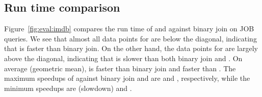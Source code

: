 


\subsection{Run time comparison}\label{sec:run-time-comparison}

Figure~\ref{fig:eval:imdb} compares the run time of \FJ and \GJ against binary join on JOB queries.
We see that almost all data points for \FJ are below the diagonal,
indicating that \FJ is faster than binary join.
On the other hand, the data points for \GJ are largely above the diagonal,
indicating that \GJ is slower than both binary join and \FJ.
On average (geometric mean), \FJ is \imdbavgfjbj faster than binary join
and \imdbavgfjgj faster than \GJ.
The maximum speedups of \FJ against binary join and \GJ
are \imdbmaxfjbj and \imdbmaxfjgj, respectively,
while the minimum speedups are \imdbminfjbj (\imdbmaxbjfj slowdown) and \imdbminfjgj.

